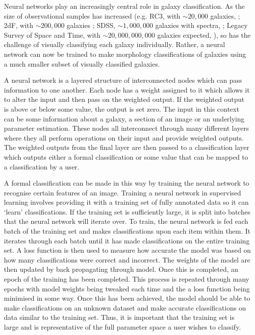 Neural networks play an increasingly central role in galaxy classification. As the size of observational samples has increased (e.g. RC3, with $\sim 20,000$ galaxies, \citealt{1991rc3..book.....D}; 2dF, with $\sim 200,000$ galaxies \citealt{2001MNRAS.328.1039C}; SDSS, $\sim 1,000,000$ galaxies with spectra, \citealt{2000AJ....120.1579Y, 2009ApJS..182..543A}; Legacy Survey of Space and Time, with $\sim 20,000,000,000$ galaxies expected, \citealt{2019ApJ...873..111I}), so has the challenge of visually classifying each galaxy individually. Rather, a neural network can now be trained to make morphology classifications of galaxies using a much smaller subset of visually classified galaxies.

A neural network is a layered structure of interconnected nodes which can pass information to one another. Each node has a weight assigned to it which allows it to alter the input and then pass on the weighted output. If the weighted output is above or below some value, the output is set zero. The input in this context can be some information about a galaxy, a section of an image or an underlying parameter estimation. These nodes all interconnect through many different layers where they all perform operations on their input and provide weighted outputs. The weighted outputs from the final layer are then passed to a classification layer which outputs either a formal classification or some value that can be mapped to a classification by a user.

A formal classification can be made in this way by training the neural network to recognise certain features of an image. Training a neural network in supervised learning involves providing it with a training set of fully annotated data so it can `learn' classifications. If the training set is sufficiently large, it is split into batches that the neural network will iterate over. To train, the neural network is fed each batch of the training set and makes classifications upon each item within them. It iterates through each batch until it has made classifications on the entire training set. A loss function is then used to measure how accurate the model was based on how many classifications were correct and incorrect. The weights of the model are then updated by back propagating through model. Once this is completed, an epoch of the training has been completed. This process is repeated through many epochs with model weights being tweaked each time and the a loss function being minimised in some way. Once this has been achieved, the model should be able to make classifications on an unknown dataset and make accurate classifications on data similar to the training set. Thus, it is important that the training set is large and is representative of the full parameter space a user wishes to classify.

